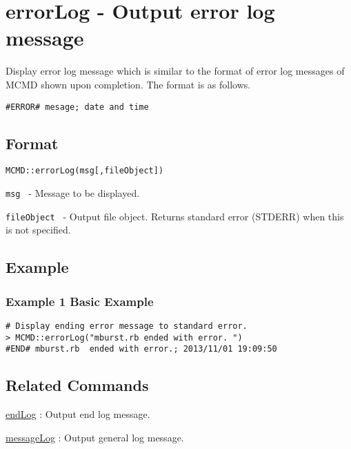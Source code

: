 
%

\section{errorLog - Output error log message \label{sect:errorLog}}

Display error log message which is similar to the format of error log messages of MCMD shown upon completion. The format is as follows. 

\begin{Verbatim}[baselinestretch=0.7,frame=single]
#ERROR# mesage; date and time
\end{Verbatim}


\subsection{Format}

{\large
\begin{verbatim}
MCMD::errorLog(msg[,fileObject])
\end{verbatim}
} 

\begin{description}
	\setlength{\itemindent}{-5mm}
	\item {\large \verb/msg /} - Message to be displayed. 
	\item {\large \verb/fileObject /} - Output file object. Returns standard error (STDERR) when this is not specified. 
	
\end{description}

\subsection{Example}
\subsubsection*{Example 1 Basic Example}

\begin{Verbatim}[baselinestretch=0.7,frame=single]
# Display ending error message to standard error. 
> MCMD::errorLog("mburst.rb ended with error. ")
#END# mburst.rb  ended with error.; 2013/11/01 19:09:50
\end{Verbatim}

\subsection{Related Commands}
\hyperref[sect:errorLogRB]{endLog} : Output end log message.

\hyperref[sect:messageRB]{messageLog} : Output general log message.

%

